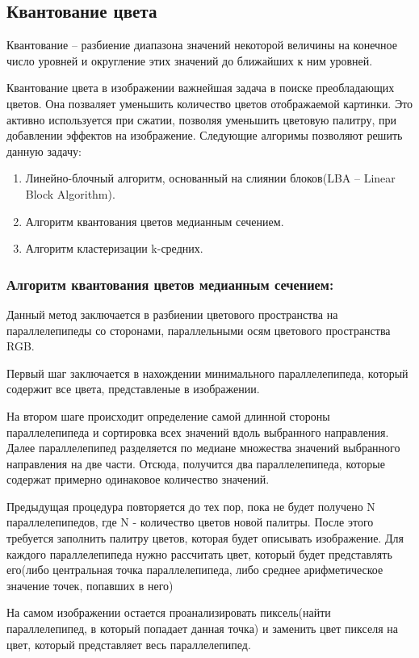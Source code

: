 \subsection{ Квантование цвета}
Квантование -- разбиение диапазона значений некоторой величины на конечное число уровней и округление этих значений до ближайших к ним уровней.

Квантование цвета в изображении важнейшая задача в поиске преобладающих цветов. Она позваляет уменьшить количество цветов отображаемой картинки. Это активно используется при сжатии, позволяя уменьшить цветовую палитру, при добавлении эффектов на изображение. Следующие алгоримы позволяют решить данную задачу:
\begin{enumerate}
	\item Линейно-блочный алгоритм, основанный на слиянии блоков(LBA -- Linear Block Algorithm).
	\item Алгоритм квантования цветов медианным сечением.
	\item Алгоритм кластеризации k-средних.
\end{enumerate}

\subsubsection{ Алгоритм квантования цветов медианным сечением:}
Данный метод заключается в разбиении цветового пространства на параллелепипеды со сторонами, параллельными осям цветового пространства RGB.

Первый шаг заключается в нахождении минимального параллелепипеда, который содержит все цвета, представленые в изображении.

На втором шаге происходит определение самой длинной стороны параллелепипеда и сортировка всех значений вдоль выбранного направления. Далее параллелепипед разделяется по медиане множества значений выбранного направления на две части. Отсюда, получится два параллелепипеда, которые содержат примерно одинаковое количество значений. 

Предыдущая процедура повторяется до тех пор, пока не будет получено N параллелепипедов, где N - количество цветов новой палитры. После этого требуется заполнить палитру цветов, которая будет описывать изображение. Для каждого параллелепипеда нужно рассчитать цвет, который будет представлять его(либо центральная точка параллелепипеда, либо среднее арифметическое значение точек, попавших в него)

На самом изображении остается проанализировать пиксель(найти параллелепипед, в который попадает данная точка) и заменить цвет пикселя на цвет, который представляет весь параллелепипед.


